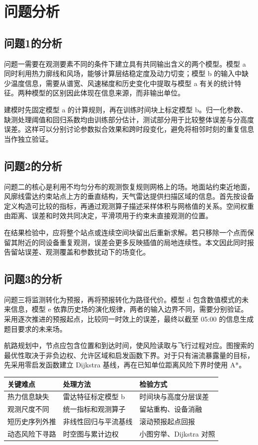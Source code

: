 \section{问题分析}
\subsection{问题1的分析}
问题一需要在观测要素不同的条件下建立具有共同输出含义的两个模型。模型 a 同时利用热力廓线和风场，能够计算层结稳定度及动力切变；模型 b 的输入中缺少温度信息，需要从谱宽、风速梯度和历史变化中提取与模型 a 有关的统计特征。两种模型的区别因此体现在信息来源，而非输出单位。

建模时先固定模型 a 的计算规则，再在训练时间块上标定模型 b。归一化参数、缺测处理阈值和回归系数均由训练部分估计，测试部分用于比较整体误差与分高度误差。这样可以分别讨论参数拟合效果和跨时段变化，避免将相邻时刻的重复信息当作独立验证。
\subsection{问题2的分析}
问题二的核心是利用不均匀分布的观测恢复规则网格上的场。地面站约束近地面，风廓线雷达约束站点上方的垂直结构，天气雷达提供扫描区域的信息。首先按设备定义构造可比较的指标，再通过观测算子描述采样体积与网格值的关系。空间权重由距离、误差和时效共同决定，平滑项用于约束未直接观测的位置。

在结果检验中，应将整个站点或连续空间块留出后重新求解。若只移除一个点而保留其附近的同设备重复观测，误差会更多反映插值的局地连续性。本文因此同时报告留站误差、观测覆盖和参数扰动下的场变化。
\subsection{问题3的分析}
问题三将监测转化为预报，再将预报转化为路径代价。模型 d 包含数值模式的未来信息，模型 e 依靠历史场的演化规律，两者的输入边界不同，需要分别验证。采用逐次推进的预报起点，比较同一时效上的误差，最终以截至 05:00 的信息生成题目要求的未来场。

航路规划中，节点应包含位置和到达时间，使风险读取与飞行过程对应。图搜索的最优性取决于非负边权、允许区域和启发函数下界。对于只有湍流暴露量的目标，先采用零启发函数建立 Dijkstra 基线，再在已知单位距离风险下界时使用 A*。
\begin{table}[H]\centering{}
\begin{tabularx}{\linewidth}{YYY}\toprule
关键难点 & 处理方法 & 检验方式\\\midrule
热力信息缺失 & 雷达特征标定模型 b & 时间块与高度分层误差\\
观测尺度不同 & 统一指标和观测算子 & 留站重构、设备消融\\
短历史序列外推 & 非线性回归与平流基线 & 滚动预报起点回报\\
动态风险下寻路 & 时空图与累计边权 & 小图穷举、Dijkstra 对照\\\bottomrule
\end{tabularx}\end{table}
